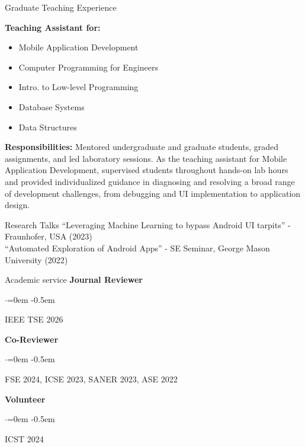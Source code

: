 \documentclass{resume} %
\renewenvironment{rSubsection}[4]{%
 {\bf #1} \hfill {#2}%
 \ifthenelse{\equal{#3}{}}{}{\\{\em #3} \hfill {\em #4}}\smallskip
 \begin{list}{$\cdot$}{\leftmargin=0em}%
  \itemsep -0.5em \vspace{-0.5em}%
 }{%
 \end{list}%
 \vspace{1pt}%
}
\begin{document}
\begin{rSection}{Graduate Teaching Experience}
\item{\bf Teaching Assistant for:}
\begin{itemize}
\item Mobile Application Development
\item Computer Programming for Engineers
\item Intro. to Low-level Programming
\item Database Systems
\item Data Structures
\end{itemize}


\item{\bf Responsibilities:}
Mentored undergraduate and graduate students, graded assignments, and led laboratory sessions. As the teaching assistant for Mobile Application Development, supervised students throughout hands-on lab hours and provided individualized guidance in diagnosing and resolving a broad range of development challenges, from debugging and UI implementation to application design.
\end{rSection}
\begin{rSection}{Research Talks}
``Leveraging Machine Learning to bypass Android UI tarpits'' - Fraunhofer, USA (2023)
\\
``Automated Exploration of Android Apps'' - SE Seminar, George Mason University (2022)
\end{rSection}


\begin{rSection}{Academic service}
\begin{rSubsection}{Journal Reviewer}{}{}{}
\item IEEE TSE 2026
\end{rSubsection}
\begin{rSubsection}{Co-Reviewer}{}{}{}
\item FSE 2024, ICSE 2023, SANER 2023, ASE 2022
\end{rSubsection}
\begin{rSubsection}{Volunteer}{}{}{}
\item ICST 2024
\end{rSubsection}
\end{rSection}
\end{document}
